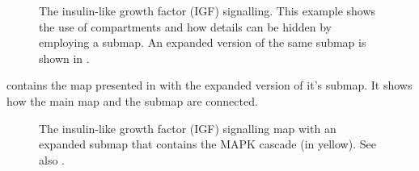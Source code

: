 \begin{figure}[htb]
\begin{center}
\caption{The insulin-like growth factor (IGF) signalling. This example shows the use of compartments and how details can be hidden by employing a submap. An expanded version of the same submap is shown in .}\label{fig:insulin}
\end{center}
\end{figure}

 contains the map presented in  with the expanded version of it’s submap. It shows how the main map and the submap are connected.

\begin{figure}[htb]
\begin{center}
\caption{The insulin-like growth factor (IGF) signalling map with an expanded submap that contains the MAPK cascade (in yellow). See also .}\label{fig:mapk}
\end{center}
\end{figure}

